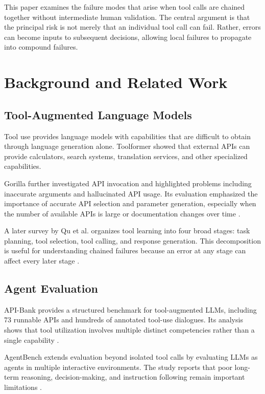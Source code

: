 \documentclass[11pt]{article}
\begin{document}
This paper examines the failure modes that arise when tool calls are chained together without
intermediate human validation. The central argument is that the principal risk is not merely that an
individual tool call can fail. Rather, errors can become inputs to subsequent decisions,
allowing local failures to propagate into compound failures.

\section{Background and Related Work}

\subsection{Tool-Augmented Language Models}

Tool use provides language models with capabilities that are difficult to obtain
through language generation alone. Toolformer showed that external APIs can
provide calculators, search systems, translation services, and other specialized
capabilities.

Gorilla further investigated API invocation and highlighted problems including
inaccurate arguments and hallucinated API usage. Its evaluation emphasized the
importance of accurate API selection and parameter generation, especially when the
number of available APIs is large or documentation changes over time \cite{patil2023gorilla}.

A later survey by Qu et al. organizes tool learning into four broad stages: task
planning, tool selection, tool calling, and response generation. This decomposition
is useful for understanding chained failures because an error at any stage can
affect every later stage \cite{qu2025survey}.

\subsection{Agent Evaluation}

API-Bank provides a structured benchmark for tool-augmented LLMs, including
73 runnable APIs and hundreds of annotated tool-use dialogues. Its analysis
shows that tool utilization involves multiple distinct competencies rather than a
single capability \cite{li2023apibank}.

AgentBench extends evaluation beyond isolated tool calls by evaluating LLMs as
agents in multiple interactive environments. The study reports that poor long-term
reasoning, decision-making, and instruction following remain important limitations \cite{liu2023agentbench}.
\end{document}
